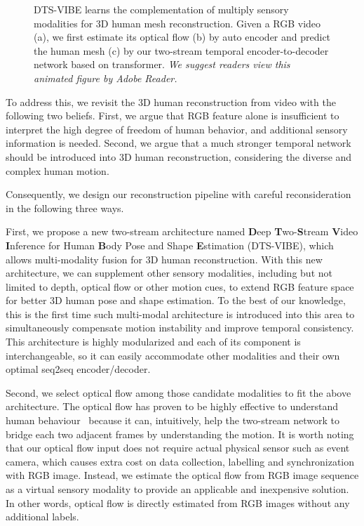 \documentclass[10pt,twocolumn,letterpaper]{article}
\begin{document}
\begin{figure}[t]
\centering
{}


\caption{DTS-VIBE learns the complementation of multiply sensory modalities for 3D human mesh reconstruction. Given a RGB video (a), we first estimate its optical flow (b) by auto encoder and predict the human mesh (c) by our two-stream temporal encoder-to-decoder network based on transformer. \emph{We suggest readers view this animated figure by Adobe Reader.}}
\label{architecture}
\end{figure}





To address this, we revisit the 3D human reconstruction from video with the following two beliefs. First, we argue that RGB feature alone is insufficient to interpret the high degree of freedom of human behavior, and additional sensory information is needed. Second, we argue that a much stronger temporal network should be introduced into 3D human reconstruction, considering the diverse and complex human motion.  

Consequently, we design our reconstruction pipeline with careful reconsideration in the following three ways. \par

First, we propose a new two-stream architecture named {\bf D}eep {\bf T}wo-{\bf S}tream {\bf V}ideo {\bf I}nference for Human {\bf B}ody Pose and Shape {\bf E}stimation (DTS-VIBE), which allows multi-modality fusion for 3D human reconstruction. With this new architecture, we can supplement other sensory modalities, including but not limited to depth, optical flow or other motion cues, to extend RGB feature space for better 3D human pose and shape estimation. To the best of our knowledge, this is the first time such multi-modal architecture is introduced into this area to simultaneously compensate motion instability and improve temporal consistency. This architecture is highly modularized and each of its component is interchangeable, so it can easily accommodate other modalities and their own optimal seq2seq encoder/decoder. \par 
Second, we select optical flow among those candidate modalities to fit the above architecture. The optical flow has proven to be highly effective to understand human behaviour~\cite{simonyan2014two} because it can, intuitively, help the two-stream network to bridge each two adjacent frames by understanding the motion. It is worth noting that our optical flow input does not require actual physical sensor such as event camera, which causes extra cost on data collection, labelling and synchronization with RGB image. Instead, we estimate the optical flow from RGB image sequence as a virtual sensory modality to provide an applicable and inexpensive solution. In other words, optical flow is directly estimated from RGB images without any additional labels.\par
\end{document}
